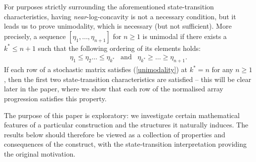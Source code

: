 \documentclass[a4paper,12pt]{article}
\begin{document}
For purposes strictly surrounding the aforementioned state-transition characteristics, having \emph{near}-log-concavity is not a necessary condition, but it leads us to prove unimodality, which is necessary (but not sufficient). More precisely, a sequence $[\eta_1,\ldots,\eta_{n+1}]$ for $n\geq 1$ is unimodal if there exists a $k^* \leq n+1$ such that the following ordering of its elements holds:
\begin{align}
\eta_1 \leq \eta_2 \ldots \leq \eta_{k^*} \,\,\,\,\, \text{and} \,\,\,\,\, \eta_{k^*} \geq \ldots \geq \eta_{n+1}. \label{unimodality}
\end{align}
If each row of a stochastic matrix satisfies (\ref{unimodality}) at $k^* = n$ for any $n\geq 1$, then the first two state-transition characteristics are satisfied -- this will be clear later in the paper, where we show that each row of the normalised array progression satisfies this property.

The purpose of this paper is exploratory: we investigate certain mathematical features of a particular construction and the structures it naturally induces. The results below should therefore be viewed as a collection of properties and consequences of the construct, with the state-transition interpretation providing the original motivation.
\end{document}
